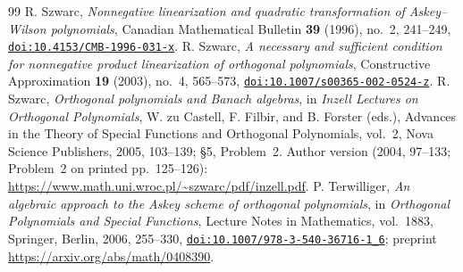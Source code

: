 \begin{thebibliography}{99}
 R. Szwarc, \emph{Nonnegative linearization and quadratic transformation of Askey--Wilson polynomials}, Canadian Mathematical Bulletin \textbf{39} (1996), no.~2, 241--249, \href{https://doi.org/10.4153/CMB-1996-031-x}{\nolinkurl{doi:10.4153/CMB-1996-031-x}}.
 R. Szwarc, \emph{A necessary and sufficient condition for nonnegative product linearization of orthogonal polynomials}, Constructive Approximation \textbf{19} (2003), no.~4, 565--573, \href{https://doi.org/10.1007/s00365-002-0524-z}{\nolinkurl{doi:10.1007/s00365-002-0524-z}}.
 R. Szwarc, \emph{Orthogonal polynomials and Banach algebras}, in \emph{Inzell Lectures on Orthogonal Polynomials}, W. zu Castell, F. Filbir, and B. Forster (eds.), Advances in the Theory of Special Functions and Orthogonal Polynomials, vol.~2, Nova Science Publishers, 2005, 103--139; \S5, Problem~2. Author version (2004, 97--133; Problem~2 on printed pp.~125--126): \url{https://www.math.uni.wroc.pl/~szwarc/pdf/inzell.pdf}.
 P. Terwilliger, \emph{An algebraic approach to the Askey scheme of orthogonal polynomials}, in \emph{Orthogonal Polynomials and Special Functions}, Lecture Notes in Mathematics, vol.~1883, Springer, Berlin, 2006, 255--330, \href{https://doi.org/10.1007/978-3-540-36716-1_6}{\nolinkurl{doi:10.1007/978-3-540-36716-1_6}}; preprint \url{https://arxiv.org/abs/math/0408390}.
\end{thebibliography}

